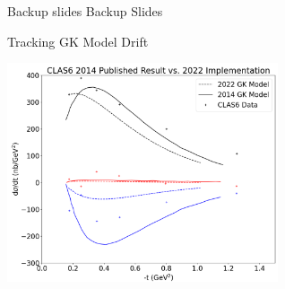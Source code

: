 \documentclass[aspectratio=169]{beamer}
\begin{document}
\fi
\begin{frame}{Backup slides}
\centering
Backup Slides

\end{frame}



\begin{frame}{Tracking GK Model Drift}

        \centering
        \includegraphics[width=0.6\textwidth]{lastminute/GK_model_Drift.png}           

\end{frame}
\end{document}
